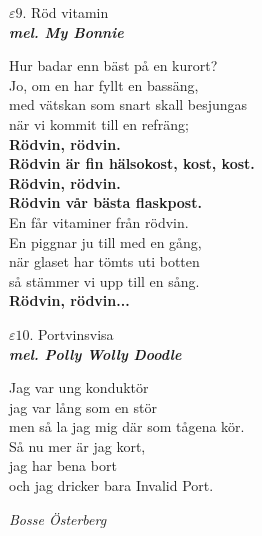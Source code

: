 \documentclass[a6paper,10pt]{article}
\newcommand{\mel}[1]{\small\textbf{\textit{mel. #1 \\}}}
\begin{document}
\setlength{\oddsidemargin}{-0.37in}
\noindent
\begin{center}
\Large $\varepsilon9$. Röd vitamin\\ 
\mel{My Bonnie}
\end{center}
Hur badar enn bäst på en kurort?\\
Jo, om en har fyllt en bassäng,\\
med vätskan som snart skall besjungas\\
när vi kommit till en refräng;
\vspace{5pt}\\
\textbf{Rödvin, rödvin.\\
Rödvin är fin hälsokost, kost, kost.\\
Rödvin, rödvin.\\
Rödvin vår bästa flaskpost.}
\vspace{5pt}\\
En får vitaminer från rödvin.\\
En piggnar ju till med en gång,\\
när glaset har tömts uti botten\\
så stämmer vi upp till en sång.
\vspace{5pt}\\
\textbf{Rödvin, rödvin...}
\vspace{30pt}
\begin{center}
\Large $\varepsilon10$. Portvinsvisa\\ 
\mel{Polly Wolly Doodle}
\end{center}
Jag var ung konduktör\\
jag var lång som en stör\\
men så la jag mig där som tågena kör.
\vspace{5pt}\\
Så nu mer är jag kort,\\
jag har bena bort\\
och jag dricker bara Invalid Port.
\begin{flushright}
\textit{Bosse Österberg}
\end{flushright}
\end{document}
